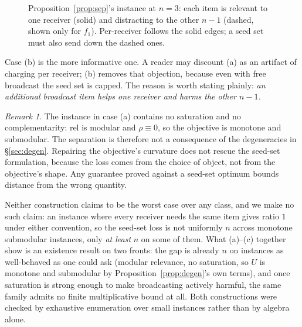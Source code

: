 \documentclass[sigconf,anonymous]{aamas}
\theoremstyle{remark}
\newtheorem{remark}{Remark}
\begin{document}
\begin{figure}[t]
\centering
{}
\caption{Proposition~\ref{prop:sep}'s instance at $n=3$: each item is
relevant to one receiver (solid) and distracting to the other $n-1$
(dashed, shown only for $f_1$). Per-receiver follows the solid edges;
a seed set must also send down the dashed ones.}
\label{fig:sep}
\end{figure}

Case (b) is the more informative one. A reader may discount (a) as an
artifact of charging per receiver; (b) removes that objection, because
even with free broadcast the seed set is capped. The reason is worth
stating plainly: \emph{an additional broadcast item helps one receiver
and harms the other $n-1$.}

\begin{remark}
The instance in case (a) contains no saturation and no
complementarity: $\mathrm{rel}$ is modular and $\rho \equiv 0$, so the
objective is monotone and submodular. The separation is therefore not
a consequence of the degeneracies in \S\ref{sec:degen}. Repairing the
objective's curvature does not rescue the seed-set formulation,
because the loss comes from the choice of object, not from the
objective's shape. Any guarantee proved against a seed-set optimum
bounds distance from the wrong quantity.
\end{remark}

Neither construction claims to be the worst case over any class, and
we make no such claim: an instance where every receiver needs the same
item gives ratio $1$ under either convention, so the seed-set loss is
not uniformly $n$ across monotone submodular instances, only
\emph{at least} $n$ on some of them. What (a)--(c) together show is an
existence result on two fronts: the gap is already $n$ on
instances as well-behaved as one could ask (modular relevance, no
saturation, so $U$ is monotone and submodular by
Proposition~\ref{prop:degen}'s own terms), and once saturation is
strong enough to make broadcasting actively harmful, the same family
admits no finite multiplicative bound at all. Both constructions were
checked by exhaustive enumeration over small instances rather than by
algebra alone.
\end{document}

